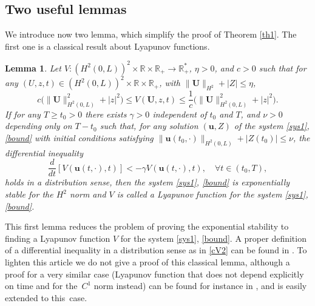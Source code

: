 \documentclass[JEP,XML,SOM,Unicode]{cedram}
\newtheorem{lem}[thm]{Lemma}
\theoremstyle{definition}
\begin{document}
\subsection{Two useful lemmas}
We introduce now two lemma, which simplify the proof of Theorem \ref{th1}. The first one is a classical result about Lyapunov functions.
\begin{lem}
Let $V: (H^{2}(0,L))^{2}\times\mathbb{R}\times\mathbb{R}_{+}\to \mathbb{R}_{+}^{*}$, {$\eta>0$,} and $c>0$ such that for any $(U,z,t)\in (H^{2}(0,L))^{2}\times\mathbb{R}\times\mathbb{R}_{+}$, {with $\|\boldsymbol{U}\|_{H^{2}}+|Z|\leq \eta$,}
\begin{equation}
c\bigl(\lVert \boldsymbol{U} \rVert_{H^{2}(0,L)}^{{2}}+|z|^{{2}}\bigr)\leq V(\boldsymbol{U},z,t)\leq \frac{1}{c} \bigl(\lVert \boldsymbol{U} \rVert_{H^{2}(0,L)}^{{2}}+|z|^{{2}}\bigr).
\label{cV1}
\end{equation}
If {for any $T\geq t_{0}>0$} there exists $\gamma>0$ {independent of $t_{0}$ and $T$,}
and ${\nu}>0$ {depending only on $T-t_{0}$} such that, for
any solution
$(\boldsymbol{u},Z)$ of the system \eqref{sys1}, \eqref{bound} with initial conditions
satisfying $\lVert \boldsymbol{u}({t_{0}},\cdot)\rVert_{H^{2}(0,L)}+|Z({t_{0}})|\leq {\nu}$, {the differential inequality}
\begin{equation}
\frac{d}{dt}\left[V(\boldsymbol{u}(t,\cdot),t)\right]<-\gamma V(\boldsymbol{u}(t,\cdot),t),\quad\forall t\in(t_{0},T),
\label{cV2}
\end{equation}
{holds} in a distribution sense, then the system \eqref{sys1}, \eqref{bound} is exponentially stable for the $H^{2}$ norm and $V$ is called a Lyapunov function for the system \eqref{sys1}, \eqref{bound}.
\label{lem1}
\end{lem}
This first lemma reduces the problem of proving the exponential stability to finding a Lyapunov function $V$ for the system \eqref{sys1}, \eqref{bound}. A proper definition of a differential inequality in a distribution sense as in \eqref{cV2} can be found in \cite{C1}. To lighten this article we do not give a proof of this classical lemma, although a proof for a very similar case (Lyapunov function that does not depend explicitly on time and for the~$C^{1}$ norm instead) can be found for instance in \cite[Prop.\,2.1]{C1}, and is easily extended to this~case. 
\end{document}
